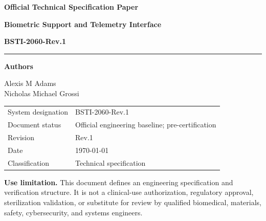 \documentclass[11pt,a4paper]{article}
\begin{document}
\begin{titlepage}
  \centering
  \vspace*{18mm}
  {\Large\bfseries\color{specblue} Official Technical Specification Paper\par}
  \vspace{12mm}
  {\huge\bfseries Biometric Support and Telemetry Interface\par}
  \vspace{5mm}
  {\LARGE\bfseries BSTI-2060-Rev.1\par}
  \vspace{18mm}
  \rule{0.82\textwidth}{0.8pt}\par
  \vspace{8mm}
  {\large\textbf{Authors}\par}
  \vspace{2mm}
  {\large Alexis M Adams\\Nicholas Michael Grossi\par}
  \vfill
  \begin{tabular}{ll}
    \toprule
    System designation & BSTI-2060-Rev.1\\
    Document status & Official engineering baseline; pre-certification\\
    Revision & Rev.1\\
    Date & \today\\
    Classification & Technical specification\\
    \bottomrule
  \end{tabular}
  \vfill
  \begin{minipage}{0.82\textwidth}
    \small\textbf{Use limitation.} This document defines an engineering specification and verification structure. It is not a clinical-use authorization, regulatory approval, sterilization validation, or substitute for review by qualified biomedical, materials, safety, cybersecurity, and systems engineers.
  \end{minipage}
\end{titlepage}

\end{document}
